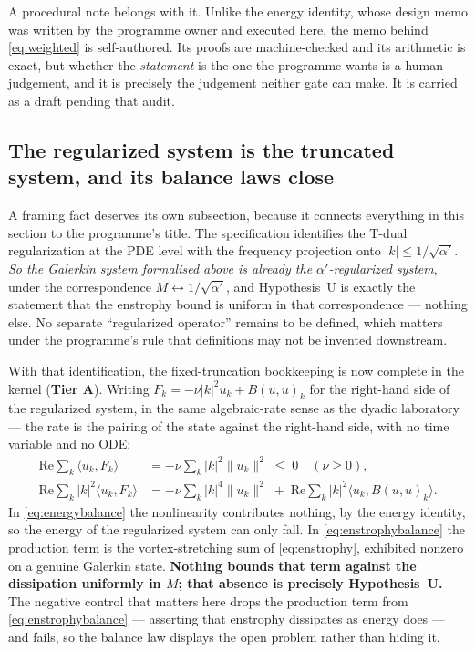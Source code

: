 \documentclass[11pt,a4paper]{article}
\newcommand{\tA}{\textcolor{TierA}{\textbf{Tier A}}}
\theoremstyle{definition}
\theoremstyle{plain}
\begin{document}
A procedural note belongs with it. Unlike the energy identity, whose design memo was written by the
programme owner and executed here, the memo behind \eqref{eq:weighted} is self-authored. Its proofs
are machine-checked and its arithmetic is exact, but whether the \emph{statement} is the one the
programme wants is a human judgement, and it is precisely the judgement neither gate can make. It is
carried as a draft pending that audit.

\subsection{The regularized system is the truncated system, and its balance laws close}
\label{sec:balance}

A framing fact deserves its own subsection, because it connects everything in this section to the
programme's title. The specification identifies the T-dual regularization at the PDE level with the
frequency projection onto $|k|\le1/\sqrt{\alpha'}$. \emph{So the Galerkin system formalised above
is already the $\alpha'$-regularized system}, under the correspondence $M\leftrightarrow
1/\sqrt{\alpha'}$, and Hypothesis~U is exactly the statement that the enstrophy bound is uniform in
that correspondence --- nothing else. No separate ``regularized operator'' remains to be defined,
which matters under the programme's rule that definitions may not be invented downstream.

With that identification, the fixed-truncation bookkeeping is now complete in the kernel
(\tA{}). Writing $F_k=-\nu|k|^2u_k+B(u,u)_k$ for the right-hand side of the regularized system,
in the same algebraic-rate sense as the dyadic laboratory --- the rate is the pairing of the state
against the right-hand side, with no time variable and no ODE:
\begin{align}
  \mathrm{Re}\sum_k\langle u_k,F_k\rangle
    &= -\nu\sum_k|k|^2\|u_k\|^2 \;\le\;0 \quad(\nu\ge0),
  \label{eq:energybalance}\\
  \mathrm{Re}\sum_k|k|^2\langle u_k,F_k\rangle
    &= -\nu\sum_k|k|^4\|u_k\|^2 \;+\; \mathrm{Re}\sum_k|k|^2\langle u_k,B(u,u)_k\rangle .
  \label{eq:enstrophybalance}
\end{align}
In \eqref{eq:energybalance} the nonlinearity contributes nothing, by the energy identity, so the
energy of the regularized system can only fall. In \eqref{eq:enstrophybalance} the production term
is the vortex-stretching sum of \eqref{eq:enstrophy}, exhibited nonzero on a genuine Galerkin
state. \textbf{Nothing bounds that term against the dissipation uniformly in $M$; that absence is
precisely Hypothesis~U.} The negative control that matters here drops the production term from
\eqref{eq:enstrophybalance} --- asserting that enstrophy dissipates as energy does --- and fails,
so the balance law displays the open problem rather than hiding it.
\end{document}
